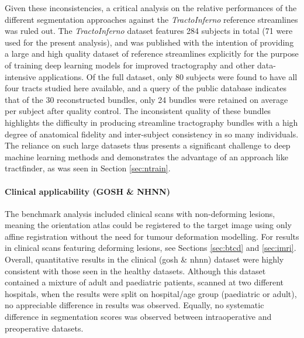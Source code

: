 Given these inconsistencies, a critical analysis on the relative performances of the different segmentation approaches against the \textit{TractoInferno} reference streamlines was ruled out.
The \textit{TractoInferno} dataset features 284 subjects in total (71 were used for the present analysis), and was published with the intention of providing a large and high quality dataset of reference streamlines explicitly for the purpose of training deep learning models for improved tractography and other data-intensive applications.
Of the full dataset, only 80 subjects were found to have all four tracts studied here available, and a query of the public database\autocite{Poulin2022a} indicates that of the 30 reconstructed bundles, only 24 bundles were retained on average per subject after quality control.
The inconsistent quality of these bundles highlights the difficulty in producing streamline tractography bundles with a high degree of anatomical fidelity and inter-subject consistency in so many individuals.
The reliance on such large datasets thus presents a significant challenge to deep machine learning methods and demonstrates the advantage of an approach like tractfinder, as was seen in Section \ref{sec:ntrain}.

\paragraph*{Clinical applicability (GOSH \& NHNN)}

The benchmark analysis included clinical scans with non-deforming lesions, meaning the orientation atlas could be registered to the target image using only affine registration without the need for tumour deformation modelling.
For results in clinical scans featuring deforming lesions, see Sections \ref{sec:btcd} and \ref{sec:imri}. %
Overall, quantitative results in the clinical (\gls{gosh} \& \gls{nhnn}) dataset were highly consistent with those seen in the healthy datasets.
Although this dataset contained a mixture of adult and paediatric patients, scanned at two different hospitals, when the results were split on hospital/age group (paediatric or adult), no appreciable difference in results was observed.
Equally, no systematic difference in segmentation scores was observed between intraoperative and preoperative datasets.

